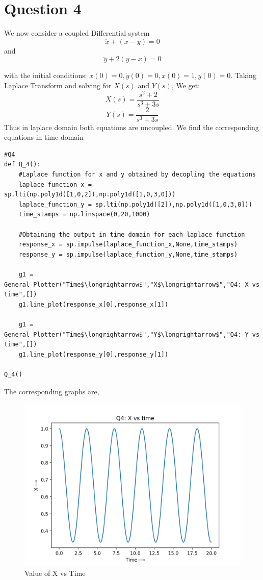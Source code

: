 \documentclass[11pt, a4paper]{article}
\begin{document}
\section{Question 4}
We now consider a coupled Differential system
\begin{equation}
    \ddot x + (x-y) = 0
\end{equation}
and 
\begin{equation}
    \ddot y + 2(y-x) = 0
\end{equation}

with the initial conditions: $\dot x(0) =0,\dot y(0) =0,x(0) =1,y(0) =0$.
Taking Laplace Transform and solving for $X(s)$ and $Y(s)$, We get:
\begin{equation}
    X(s) = \frac{s^2+2}{s^3 + 3s}
\end{equation}
\begin{equation}
    Y(s) = \frac{2}{s^3 + 3s}
\end{equation}
Thus in laplace domain both equations are uncoupled. We find the corresponding equations in time domain

\begin{lstlisting}
#Q4
def Q_4():
	#Laplace function for x and y obtained by decopling the equations
	laplace_function_x = sp.lti(np.poly1d([1,0,2]),np.poly1d([1,0,3,0]))
	laplace_function_y = sp.lti(np.poly1d([2]),np.poly1d([1,0,3,0]))
	time_stamps = np.linspace(0,20,1000)

	#Obtaining the output in time domain for each laplace function
	response_x = sp.impulse(laplace_function_x,None,time_stamps)
	response_y = sp.impulse(laplace_function_y,None,time_stamps)

	g1 = General_Plotter("Time$\longrightarrow$","X$\longrightarrow$","Q4: X vs time",[])
	g1.line_plot(response_x[0],response_x[1])

	g1 = General_Plotter("Time$\longrightarrow$","Y$\longrightarrow$","Q4: Y vs time",[])
	g1.line_plot(response_y[0],response_y[1])

Q_4()
\end{lstlisting}
The corresponding graphs are,
\begin{figure}[h!]
\centering
\includegraphics[scale=0.6]{Q4_1.png}
\caption{Value of X vs Time}
\label{Value of X vs Time}
\end{figure}
\clearpage
\end{document}
